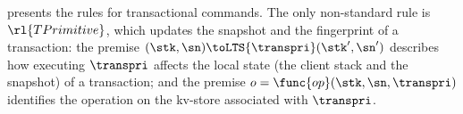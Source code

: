  presents the rules for transactional commands. 
The only non-standard rule is \( \rl{TPrimitive} \), which updates 
the snapshot and the fingerprint of a transaction: the premise 
$(\stk, \sn) \toLTS{\transpri} (\stk', \sn')$ describes how executing
$\transpri$ affects the local state (the client stack and the snapshot)
of a transaction; and the premise $o =\func{op}(\stk, \sn, \transpri)$ identifies the operation on the 
kv-store associated with $\transpri$. 


